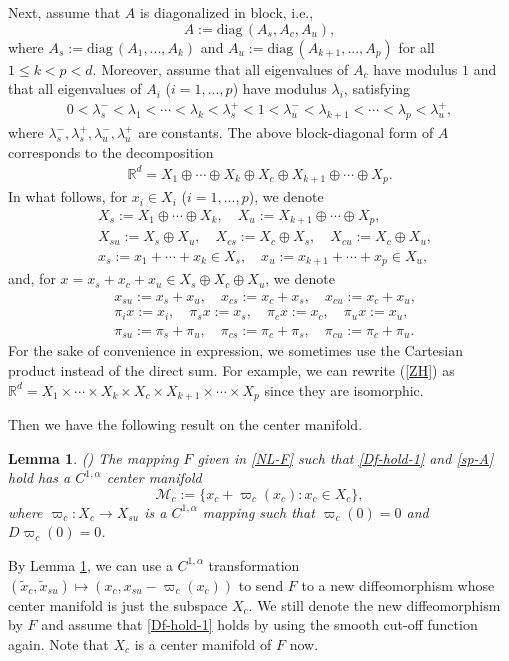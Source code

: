 \documentclass[reqno]{amsart}
\numberwithin{equation}{section}
\newtheorem{lemma}[theorem]{Lemma}
\begin{document}
Next, assume
that $A$ is diagonalized in block, i.e.,
$$
A:=\mathrm{diag}\, (A_s,A_c,A_u),
$$
where
$A_s:=\mathrm{diag}\, (A_1,...,A_k)$ and  $A_u:=\mathrm{diag}\, (A_{k+1},..., A_p)$ for all $1\le k <p<d$.
Moreover, assume that all eigenvalues of $A_c$ have modulus $1$ and that all eigenvalues of $A_i$ ($i=1,...,p$) have modulus $\lambda_i$, satisfying
\begin{align}\label{sp-A}
0<\lambda_s^-<\lambda_1<\cdots<\lambda_k<\lambda_s^+<1<\lambda_u^-<\lambda_{k+1}<\cdots<\lambda_p<\lambda_u^+,
\end{align}
where $\lambda_s^-,\lambda_s^+,\lambda_u^-,\lambda_u^+$ are constants.
The above block-diagonal form of $A$ corresponds to the decomposition
\begin{align}\label{ZH}
\mathbb{R}^d=X_1 \oplus \cdots \oplus X_k \oplus X_c \oplus X_{k+1}\oplus \cdots \oplus X_p.
\end{align}
In what follows, for $x_i\in X_i$ ($i=1,...,p$),  we denote
\begin{align*}
& X_s:=X_1\oplus \cdots \oplus X_k, \quad X_u:=X_{k+1}\oplus \cdots \oplus X_p,
\\
&X_{su}:=X_s\oplus X_u,\quad X_{cs}:=X_c\oplus X_s,\quad X_{cu}:=X_c\oplus X_u,
\\
& x_s:=x_1+\cdots +x_k\in X_s, \quad x_u:=x_{k+1}+\cdots +x_p\in X_u,
\end{align*}
and, for $x=x_s+x_c+x_u\in X_s\oplus X_c\oplus X_u$, we denote
\begin{align*}
&x_{su}:=x_s+x_u,\quad x_{cs}:=x_c+x_s,\quad x_{cu}:=x_c+x_u,
\\
&\pi_i x :=x_i, \quad \pi_s x :=x_s, \quad \pi_c x:=x_c, \quad \pi_u x:=x_u,
\\
&\pi_{su}:=\pi_s+\pi_u,\quad \pi_{cs}:=\pi_c+\pi_s,\quad \pi_{cu}:=\pi_c+\pi_u.
\end{align*}
For the sake of convenience in expression, we sometimes use the Cartesian product instead of the direct sum. For example, we can rewrite (\ref{ZH}) as
$
\mathbb{R}^d=X_1 \times \cdots \times X_k \times X_c \times X_{k+1}\times \cdots \times X_p
$
since they are isomorphic.

Then we have the following result on the center manifold.

\begin{lemma}\label{cen-lem}
{\rm (\cite{Ga-CMP})}
The mapping $F$ given in \eqref{NL-F} such that \eqref{Df-hold-1} and \eqref{sp-A} hold has 
a $C^{1,\alpha}$ center manifold   
$$
\mathcal{M}_c:=\{x_c+\varpi_c(x_c):x_c\in X_c\},
$$
where $\varpi_c:X_c\to X_{su}$ is 
a $C^{1,\alpha}$ mapping 
such that
$\varpi_c(0)=0$ and $D\varpi_c(0)=0$.
\end{lemma}
\noindent By Lemma \ref{cen-lem}, we can use 
a $C^{1,\alpha}$ transformation 
$(\tilde{x}_c,\tilde{x}_{su})\mapsto(x_c,x_{su}-\varpi_c(x_c))$ to send $F$ to a new diffeomorphism whose center manifold is just the subspace $X_c$. 
We still denote the new diffeomorphism
by $F$ and assume that \eqref{Df-hold-1} holds by using the smooth cut-off function again. Note that $X_c$ is a center manifold of $F$ now.
\end{document}
